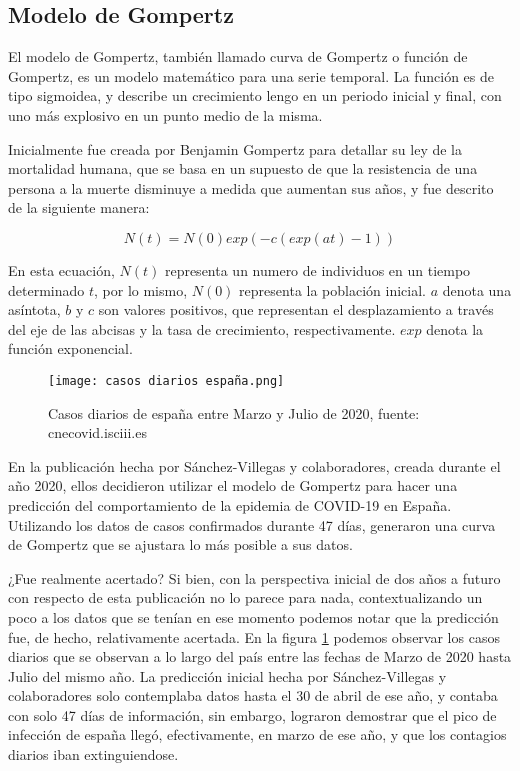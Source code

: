 \subsection{Modelo de Gompertz}
El modelo de Gompertz, también llamado curva de Gompertz o función de Gompertz, es un modelo matemático para una serie temporal. La función es de tipo sigmoidea, y describe un crecimiento lengo en un periodo inicial y final, con uno más explosivo en un punto medio de la misma.

Inicialmente fue creada por Benjamin Gompertz para detallar su ley de la mortalidad humana, que se basa en un supuesto de que la resistencia de una persona a la muerte disminuye a medida que aumentan sus años, y fue descrito de la siguiente manera:

\begin{equation}
    N(t) = N(0) exp( -c ( exp(at) - 1))
\end{equation}

En esta ecuación, $N(t)$ representa un numero de individuos en un tiempo determinado $t$, por lo mismo, $N(0)$ representa la población inicial. $a$ denota una asíntota, $b$ y $c$ son valores positivos, que representan el desplazamiento a través del eje de las abcisas y la tasa de crecimiento, respectivamente. $exp$ denota la función exponencial.

\begin{figure*}
    \texttt{[image: casos diarios españa.png]}
    \caption{Casos diarios de españa entre Marzo y Julio de 2020, fuente: cnecovid.isciii.es}
    \label{diarios españa}
\end{figure*}

En la publicación hecha por Sánchez-Villegas y colaboradores\cite{sanchez-villegas_codina_2020}, creada durante el año 2020, ellos decidieron utilizar el modelo de Gompertz para hacer una predicción del comportamiento de la epidemia de COVID-19 en España. Utilizando los datos de casos confirmados durante 47 días, generaron una curva de Gompertz que se ajustara lo más posible a sus datos.

¿Fue realmente acertado? Si bien, con la perspectiva inicial de dos años a futuro con respecto de esta publicación no lo parece para nada, contextualizando un poco a los datos que se tenían en ese momento podemos notar que la predicción fue, de hecho, relativamente acertada. En la figura \ref{diarios españa} podemos observar los casos diarios que se observan a lo largo del país entre las fechas de Marzo de 2020 hasta Julio del mismo año. La predicción inicial hecha por Sánchez-Villegas y colaboradores solo contemplaba datos hasta el 30 de abril de ese año, y contaba con solo 47 días de información, sin embargo, lograron demostrar que el pico de infección de españa llegó, efectivamente, en marzo de ese año, y que los contagios diarios iban extinguiendose.

